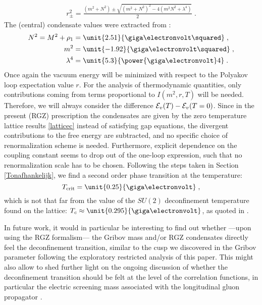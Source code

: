 \begin{eqnarray}
r_{\pm}^{2} = \frac{ (m^{2}+N^{2}) \pm \sqrt{ (m^{2}+N^{2})^{2} - 4(m^{2}N^{2}+\lambda^{4}) } }{2}\;.
\end{eqnarray}
The (central) condensate values were extracted from \cite{Cucchieri:2011ig}:
\begin{subequations}\label{latticec}
\begin{align}
N^2 = M^2+\rho_1 &= \unit{2.51}{\giga\electronvolt\squared} \;, \\
m^2 &= \unit{-1.92}{\giga\electronvolt\squared} \;, \\
\lambda^4 &= \unit{5.3}{\power{\giga\electronvolt}4} \;.
\end{align}
\end{subequations}
Once again the vacuum energy will be minimized with respect to the Polyakov loop expectation
value $r$. For the analysis of thermodynamic quantities, only contributions coming from terms
proportional to $I(m^{2},r,T)$ will be needed. Therefore, we will always consider the
difference ${\cal E}_{v}(T) - {\cal E}_{v}(T=0)$. Since in the present  (RGZ) prescription the
condensates are given by the zero temperature lattice results \eqref{latticec} instead of
satisfying gap equations, the divergent contributions to the free energy are subtracted, and no
specific choice of renormalization scheme is needed. Furthermore, explicit dependence on the
coupling constant seems to drop out of the one-loop expression, such that no renormalization
scale has to be chosen. Following the steps taken in Section \ref{Tonafhankelijk}, we find a
second order phase transition at the temperature:
\begin{equation}
T_\text{crit} = \unit{0.25}{\giga\electronvolt} \;,
\end{equation}
which is not that far from the value of the $SU(2)$ deconfinement temperature  found on the lattice: $T_c\approx\unit{0.295}{\giga\electronvolt}$, as
quoted in \cite{Cucchieri:2007ta,Fingberg:1992ju}.

In future work, it would in particular be interesting to find out whether
---upon using the RGZ formalism--- the Gribov mass and/or RGZ condensates
directly feel the deconfinement transition, similar to the cusp we
discovered in the Gribov parameter following the exploratory restricted
analysis of this paper. This might also allow to shed further light on the
ongoing discussion of whether the deconfinement transition should be felt at
the level of the correlation functions, in particular the electric screening
mass associated with the longitudinal gluon propagator \cite{Cucchieri:2012nx,Cucchieri:2007ta,Cucchieri:2014nya,Silva:2013maa}.

